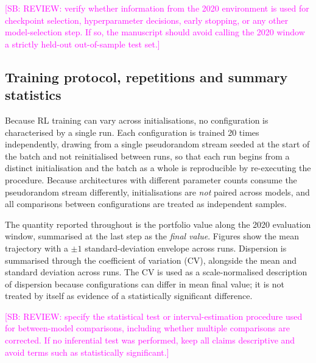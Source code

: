 \documentclass[aps,floatfix,superscriptaddress,twocolumn,tightenlines,amsmath,amssymb,nofootinbib,10pt,longbibliography,prl]{revtex4-2}
\newcommand{\sam}[1]{\textcolor{magenta}{[SB: {#1}]}}
\begin{document}
\sam{REVIEW: verify whether information from the 2020 environment is used for checkpoint selection, hyperparameter decisions, early stopping, or any other model-selection step. If so, the manuscript should avoid calling the 2020 window a strictly held-out out-of-sample test set.}

\subsection{Training protocol, repetitions and summary statistics}
\label{subsec:protocol}

Because RL training can vary across initialisations, no configuration is characterised by a single run. Each configuration is trained \num{20} times independently, drawing from a single pseudorandom stream seeded at the start of the batch and not reinitialised between runs, so that each run begins from a distinct initialisation and the batch as a whole is reproducible by re-executing the procedure. Because architectures with different parameter counts consume the pseudorandom stream differently, initialisations are \emph{not} paired across models, and all comparisons between configurations are treated as independent samples.

The quantity reported throughout is the portfolio value along the 2020 evaluation window, summarised at the last step as the \emph{final value}. Figures show the mean trajectory with a $\pm 1$ standard-deviation envelope across runs. Dispersion is summarised through the coefficient of variation (CV), alongside the mean and standard deviation across runs. The CV is used as a scale-normalised description of dispersion because configurations can differ in mean final value; it is not treated by itself as evidence of a statistically significant difference.

\sam{REVIEW: specify the statistical test or interval-estimation procedure used for between-model comparisons, including whether multiple comparisons are corrected. If no inferential test was performed, keep all claims descriptive and avoid terms such as statistically significant.}
\end{document}
